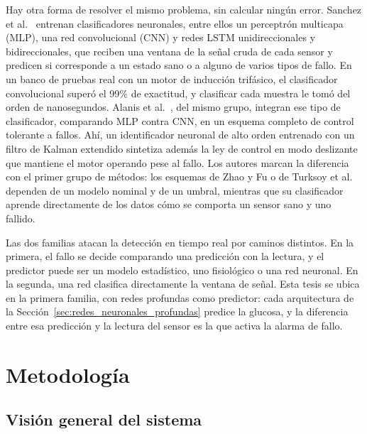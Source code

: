 \documentclass{report}
\begin{document}
Hay otra forma de resolver el mismo problema, sin calcular ningún error. Sanchez et al.~\cite{sanchez2023realtime} entrenan clasificadores neuronales, entre ellos un perceptrón multicapa (MLP), una red convolucional (CNN) y redes LSTM unidireccionales y bidireccionales, que reciben una ventana de la señal cruda de cada sensor y predicen si corresponde a un estado sano o a alguno de varios tipos de fallo. En un banco de pruebas real con un motor de inducción trifásico, el clasificador convolucional superó el 99\% de exactitud, y clasificar cada muestra le tomó del orden de nanosegundos. Alanis et al.~\cite{alanis2024fault}, del mismo grupo, integran ese tipo de clasificador, comparando MLP contra CNN, en un esquema completo de control tolerante a fallos. Ahí, un identificador neuronal de alto orden entrenado con un filtro de Kalman extendido sintetiza además la ley de control en modo deslizante que mantiene el motor operando pese al fallo. Los autores marcan la diferencia con el primer grupo de métodos: los esquemas de Zhao y Fu o de Turksoy et al. dependen de un modelo nominal y de un umbral, mientras que su clasificador aprende directamente de los datos cómo se comporta un sensor sano y uno fallido.

Las dos familias atacan la detección en tiempo real por caminos distintos. En la primera, el fallo se decide comparando una predicción con la lectura, y el predictor puede ser un modelo estadístico, uno fisiológico o una red neuronal. En la segunda, una red clasifica directamente la ventana de señal. Esta tesis se ubica en la primera familia, con redes profundas como predictor: cada arquitectura de la Sección~\ref{sec:redes_neuronales_profundas} predice la glucosa, y la diferencia entre esa predicción y la lectura del sensor es la que activa la alarma de fallo.

\chapter{Metodología}
\label{cap:metodologia}

\section{Visión general del sistema}
\label{sec:vision_general_sistema}
\end{document}
